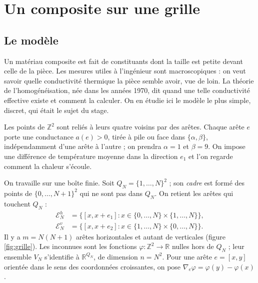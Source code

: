 \documentclass[11pt,a4paper]{article}
\theoremstyle{plain}
\theoremstyle{definition}
\theoremstyle{remark}
\newcommand{\R}{\mathbb{R}}
\newcommand{\Z}{\mathbb{Z}}
\newcommand{\E}{\mathcal{E}}
\begin{document}
\tableofcontents

\section{Un composite sur une grille}

\subsection{Le modèle}

Un matériau composite est fait de constituants dont la taille est petite devant celle de la pièce. Les mesures utiles à l'ingénieur sont macroscopiques : on veut savoir quelle conductivité thermique la pièce semble avoir, vue de loin. La théorie de l'homogénéisation, née dans les années 1970, dit quand une telle conductivité effective existe et comment la calculer. On en étudie ici le modèle le plus simple, discret, qui était le sujet du stage.

Les points de $\Z^2$ sont reliés à leurs quatre voisins par des arêtes. Chaque arête $e$ porte une conductance $a(e)>0$, tirée à pile ou face dans $\{\alpha,\beta\}$, indépendamment d'une arête à l'autre ; on prendra $\alpha=1$ et $\beta=9$. On impose une différence de température moyenne dans la direction $e_1$ et l'on regarde comment la chaleur s'écoule.

On travaille sur une boîte finie. Soit $Q_N=\{1,\dots,N\}^2$ ; son \emph{cadre} est formé des points de $\{0,\dots,N+1\}^2$ qui ne sont pas dans $Q_N$. On retient les arêtes qui touchent $Q_N$ :
\[
  \begin{aligned}
  \E^h_N&=\big\{[x,x+e_1] : x\in\{0,\dots,N\}\times\{1,\dots,N\}\big\},\\
  \E^v_N&=\big\{[x,x+e_2] : x\in\{1,\dots,N\}\times\{0,\dots,N\}\big\}.
  \end{aligned}
\]
Il y a $m=N(N+1)$ arêtes horizontales et autant de verticales (figure \ref{fig:grille}). Les inconnues sont les fonctions $\varphi:\Z^2\to\R$ nulles hors de $Q_N$ ; leur ensemble $V_N$ s'identifie à $\R^{Q_N}$, de dimension $n=N^2$. Pour une arête $e=[x,y]$ orientée dans le sens des coordonnées croissantes, on pose $\nabla_e\varphi=\varphi(y)-\varphi(x)$.
\end{document}
